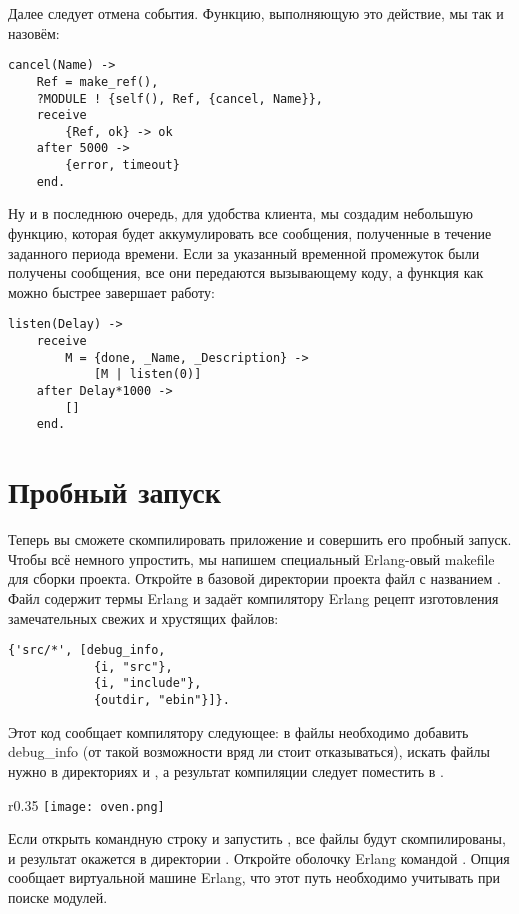 Далее следует отмена события.
Функцию, выполняющую это действие, мы так и назовём:
\begin{lstlisting}[style=erlang]
cancel(Name) ->
    Ref = make_ref(),
    ?MODULE ! {self(), Ref, {cancel, Name}},
    receive
        {Ref, ok} -> ok
    after 5000 ->
        {error, timeout}
    end.
\end{lstlisting}

Ну и в последнюю очередь, для удобства клиента, мы создадим небольшую функцию, которая будет аккумулировать все сообщения, полученные в течение заданного периода времени.
Если за указанный временной промежуток были получены сообщения, все они передаются вызывающему коду, а функция как можно быстрее завершает работу:
\begin{lstlisting}[style=erlang]
listen(Delay) ->
    receive
        M = {done, _Name, _Description} ->
            [M | listen(0)]
    after Delay*1000 ->
        []
    end.
\end{lstlisting}
\section{Пробный запуск}
\label{a-test-drive}
Теперь вы сможете скомпилировать приложение и совершить его пробный запуск.
Чтобы всё немного упростить, мы напишем специальный Erlang\--овый makefile для сборки проекта.
Откройте в базовой директории проекта файл с названием .
Файл содержит термы Erlang и задаёт компилятору Erlang рецепт изготовления замечательных свежих и хрустящих  файлов:
\begin{lstlisting}[style=erlang]
{'src/*', [debug_info,
            {i, "src"},
            {i, "include"},
            {outdir, "ebin"}]}.
\end{lstlisting}

Этот код сообщает компилятору следующее: в файлы необходимо добавить debug\_info (от такой возможности вряд ли стоит отказываться), искать файлы нужно в директориях  и , а результат компиляции следует поместить в .

\begin{wrapfigure}{r}{0.35\linewidth}
    \texttt{[image: oven.png]}
\end{wrapfigure}

Если открыть командную строку и запустить , все файлы будут скомпилированы, и результат окажется в директории .
Откройте  оболочку Erlang командой .
Опция  сообщает виртуальной машине Erlang, что этот путь необходимо учитывать при поиске модулей.


